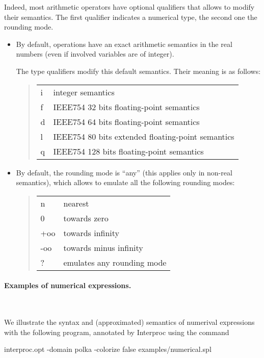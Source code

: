 \documentclass[a4paper,11pt]{article}
\begin{document}
Indeed, most arithmetic operators have optional qualifiers that
allows to modify their semantics. The first qualifier indicates a
numerical type, the second one the rounding mode.
\begin{itemize}
\item By default, operations have an exact arithmetic semantics in
  the real numbers (even if involved variables are of integer).

  The type qualifiers modify this default semantics.
  Their meaning is as follows:
  \begin{quote}
    \begin{tabular}{ll}
      i & integer semantics \\
      f & IEEE754 32 bits floating-point semantics \\
      d & IEEE754 64 bits floating-point semantics \\
      l & IEEE754 80 bits extended floating-point semantics \\
      q & IEEE754 128 bits floating-point semantics \\
    \end{tabular}
  \end{quote}

\item By default, the rounding mode is ``any'' (this applies only
  in non-real semantics), which allows to emulate all the
  following rounding modes:
  \begin{quote}
    \begin{tabular}{ll}
      n & nearest \\
      0 & towards zero \\
      +oo & towards infinity \\
      -oo & towards minus infinity \\
      ? & emulates any rounding mode
    \end{tabular}
  \end{quote}
\end{itemize}

\paragraph{Examples of numerical expressions.}\T~

We illustrate the syntax and (approximated) semantics of numerival
expressions with the following program, annotated by Interproc
using the command
\begin{example}
  interproc.opt -domain polka -colorize false examples/numerical.spl  
\end{example}
\end{document}
